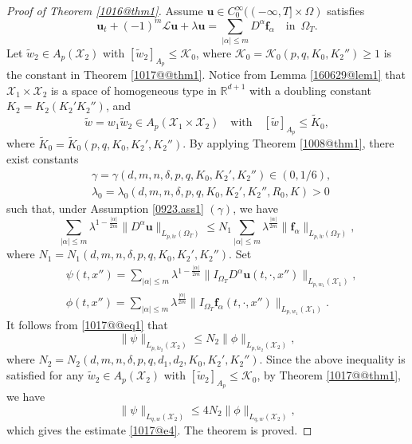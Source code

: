 \documentclass[reqno]{amsart}
\numberwithin{equation}{section}
\theoremstyle{plain}
\theoremstyle{definition}
\theoremstyle{remark}
\begin{document}
\begin{proof}[Proof of Theorem \ref{1016@thm1}]
Assume ${\boldsymbol{u}}\in C^\infty_0((-\infty,T]\times \Omega)$ satisfies
\[
{\boldsymbol{u}}_t+(-1)^m {\mathcal{L}}{\boldsymbol{u}}+\lambda{\boldsymbol{u}}=\sum_{|\alpha| \le m}D^\alpha {\boldsymbol{f}}_\alpha \quad \text{in }\, \Omega_T.
\]
Let $\tilde{w}_2\in A_p({\mathcal{X}}_2)$ with $[\tilde{w}_2]_{A_p}\le {\mathcal{K}}_0$, where  ${\mathcal{K}}_0={\mathcal{K}}_0(p,q,K_0,K_2'')\ge 1$ is the constant in Theorem \ref{1017@@thm1}.
Notice from Lemma \ref{160629@lem1} that  ${\mathcal{X}}_1\times {\mathcal{X}}_2$ is a space of homogeneous type in ${\mathbb{R}}^{d+1}$ with a doubling constant $K_2=K_2(K_2'K_2'')$, and
\[
\tilde{w}=w_1\tilde{w}_2\in A_p({\mathcal{X}}_1\times {\mathcal{X}}_2) \quad \text{with}\quad [\tilde{w}]_{A_p}\le \tilde{K}_0,
\]
where $\tilde{K}_0=\tilde{K}_0(p,q,K_0,K_2',K_2'')$.
By applying Theorem \ref{1008@thm1}, there exist constants 
\begin{align*}
&\gamma=\gamma(d,m,n,\delta,p,q,K_0,K_2',K_2'')\in (0,1/6),\\
&\lambda_0=\lambda_0(d,m,n,\delta,p,q, K_0,K_2',K_2'',R_0,K)>0
\end{align*}
such that, under Assumption \ref{0923.ass1} $(\gamma)$, we have 
\begin{equation}		\label{1017@@eq1}
\sum_{|\alpha| \le m}\lambda^{1-\frac{|\alpha|}{2m}}\|D^\alpha {\boldsymbol{u}}\|_{L_{p,\tilde{w}}(\Omega_T)}\le N_1\sum_{|\alpha| \le m}\lambda^{\frac{|\alpha|}{2m}}\|{\boldsymbol{f}}_\alpha\|_{L_{p,\tilde{w}}(\Omega_T)},
\end{equation}
where $N_1=N_1(d,m,n,\delta,p,q,K_0,K_2',K_2'')$.
Set  
\begin{align*}
&\psi(t,x'')=\sum_{|\alpha|\le m}\lambda^{1-\frac{|\alpha|}{2m}}\| I_{\Omega_T}D^\alpha {\boldsymbol{u}}(t,\cdot,x'')\|_{L_{p,w_1}({\mathcal{X}}_1)},\\
&\phi(t,x'')=\sum_{|\alpha| \le m}\lambda^{\frac{|\alpha|}{2m}}\| I_{\Omega_T}{\boldsymbol{f}}_\alpha(t,\cdot,x'')\|_{L_{p,w_1}({\mathcal{X}}_1)}.
\end{align*}
It follows from \eqref{1017@@eq1} that  
\begin{equation*}
\|\psi\|_{L_{p,\tilde{w}_2}({\mathcal{X}}_2)}\le N_2\|\phi\|_{L_{p,\tilde{w}_2}({\mathcal{X}}_2)},
\end{equation*}
where $N_2=N_2(d,m,n,\delta,p,q,d_1,d_2,K_0,K_2',K_2'')$. 
Since the above inequality is satisfied for any $\tilde{w}_2\in A_p({\mathcal{X}}_2)$ with $[\tilde{w}_2]_{A_p}\le {\mathcal{K}}_0$, by Theorem \ref{1017@@thm1}, we have 
\[
\|\psi\|_{L_{q,w}({\mathcal{X}}_2)}\le 4N_2\|\phi\|_{L_{q,w}({\mathcal{X}}_2)},
\]
which gives the estimate \eqref{1017@e4}.
The theorem is proved.
\end{proof}
\end{document}
